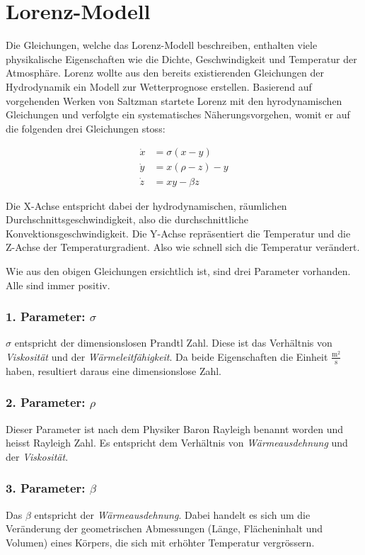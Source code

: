 

\section{Lorenz-Modell}\label{lorenz-modell}
Die Gleichungen, welche das Lorenz-Modell beschreiben, enthalten viele physikalische Eigenschaften wie die Dichte, Geschwindigkeit und Temperatur der Atmosphäre. Lorenz wollte aus den bereits existierenden Gleichungen der Hydrodynamik ein Modell zur Wetterprognose erstellen. Basierend auf vorgehenden Werken von Saltzman startete Lorenz mit den hyrodynamischen Gleichungen und verfolgte ein systematisches Näherungsvorgehen, womit er auf die folgenden drei Gleichungen stoss:

\begin{align}
\dot{x} &= \sigma(x - y)\\
\dot{y} &= x(\rho - z) - y\\
\dot{z} &= xy - \beta z
\end{align}

Die X-Achse entspricht dabei der hydrodynamischen, räumlichen Durchschnittsgeschwindigkeit, also die durchschnittliche Konvektionsgeschwindigkeit. Die Y-Achse repräsentiert die Temperatur und die Z-Achse der Temperaturgradient. Also wie schnell sich die Temperatur verändert. 

Wie aus den obigen Gleichungen ersichtlich ist, sind drei Parameter vorhanden. Alle sind immer positiv.

\subsubsection{1. Parameter: $\sigma$}
$\sigma$ entspricht der dimensionslosen Prandtl Zahl. Diese ist das Verhältnis von \textit{Viskosität} und der \textit{Wärmeleitfähigkeit}. Da beide Eigenschaften die Einheit $\frac{\text{m}^2}{\text{s}}$ haben, resultiert daraus eine dimensionslose Zahl.

\subsubsection{2. Parameter: $\rho$}
Dieser Parameter ist nach dem Physiker Baron Rayleigh benannt worden und heisst Rayleigh Zahl. Es entspricht dem Verhältnis von \textit{Wärmeausdehnung} und der \textit{Viskosität}.

\subsubsection{3. Parameter: $\beta$}
Das $ \beta $ entspricht der \textit{Wärmeausdehnung}. Dabei handelt es sich um die Veränderung der geometrischen Abmessungen (Länge, Flächeninhalt und Volumen) eines Körpers, die sich mit erhöhter Temperatur vergrössern.

